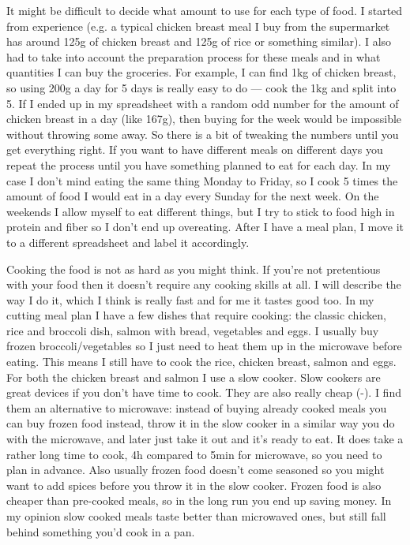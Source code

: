 \documentclass[openany, 12pt]{book}
\begin{document}
        It might be difficult to decide what amount to use for each type of food. I started from experience (e.g. a typical chicken breast meal I buy
        from the supermarket has around 125g of chicken breast and 125g of rice or something similar). I also had to take into account the preparation process for these
        meals and in what quantities I can buy the groceries. For example, I can find 1kg of chicken breast, so using 200g a day for 5 days is really easy to do --- cook the 1kg
        and split into 5. If I ended up in my spreadsheet with a random odd number for the amount of chicken breast in a day (like 167g), then buying for the week would be
        impossible without throwing some away. So there is a bit of tweaking the numbers until you get everything right. If you want to have different meals on different days 
        you repeat the process until
        you have something planned to eat for each day. In my case I don't mind eating the same thing Monday to Friday, so I cook 5 times the amount of food I would eat in a 
        day every
        Sunday for the next week. On the weekends I allow myself to eat different things, but I try to stick to food high in protein and fiber so I don't end up overeating.
        After I have a meal plan, I move it to a different spreadsheet and label it accordingly.

        Cooking the food is not as hard as you might think. If you're not pretentious with your food then it doesn't require any cooking skills at all. I will describe the way
        I do it, which I think is really fast and for me it tastes good too. In my cutting meal plan I have a few dishes that require cooking: the classic chicken,
        rice and broccoli dish, salmon with bread, vegetables and eggs. I usually buy frozen broccoli/vegetables so I just need to heat them up in the microwave before eating.
        This means I still have to cook the rice, chicken breast, salmon and eggs. For both the chicken breast and salmon I use a slow cooker. Slow cookers are great devices
        if you don't have time to cook. They are also really cheap (-). I find them an alternative to microwave: instead of buying already 
        cooked meals you can buy frozen
        food instead, throw it in the slow cooker in a similar way you do with the microwave, and later just take it out and it's ready to eat. It does take a rather long time 
        to cook, 4h
        compared to 5min for microwave, so you need to plan in advance. Also usually frozen food doesn't come seasoned so you might want to add spices before you throw it in 
        the slow cooker. Frozen food is also cheaper than pre-cooked meals, so in the long run you end up saving money. In my opinion slow cooked meals taste better than
        microwaved ones, but still fall behind something you'd cook in a pan.
\end{document}
